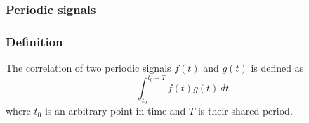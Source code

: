 \documentclass[aspectratio=169]{beamer}
\begin{document}
\begin{frame}
  \frametitle{Periodic signals}

  \centering
\end{frame}

\begin{frame}
  \frametitle{Definition}
  
  The correlation of two periodic signals $f(t)$ and $g(t)$ is defined as \[\int_{t_0}^{t_0 + T} f(t) g(t) \,dt\] where $t_0$ is an arbitrary point in time and $T$ is their shared period.
\end{frame}
\end{document}
